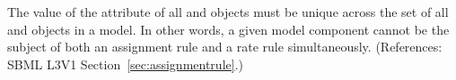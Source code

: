 The value of the attribute  of all \AssignmentRule and
\RateRule objects must be unique across the set of all \AssignmentRule and
\RateRule objects in a model.  In other words, a given model component
cannot be the subject of both an assignment rule and a rate rule
simultaneously.  (References: SBML L3V1 Section~\ref{sec:assignmentrule}.)
